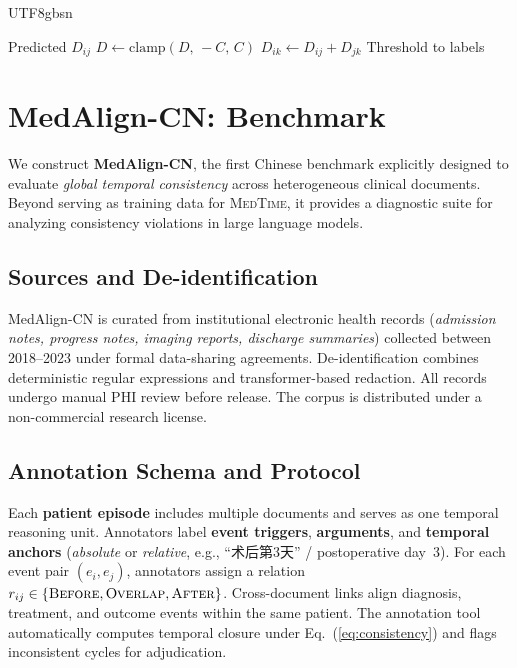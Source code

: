 \documentclass[11pt]{article}
\begin{document}
\begin{CJK*}{UTF8}{gbsn}
\begin{algorithm}[t]
\small
\caption{Hard Acyclic Closure for Inference}
\label{alg:hard-closure-test}
\begin{algorithmic}[1]
\REQUIRE Predicted $D_{ij}$
\STATE $D \leftarrow \mathrm{clamp}(D,\,-C,\,C)$
     \STATE $D_{ik} \leftarrow D_{ij}+D_{jk}$
  \ENDIF
\ENDFOR
\STATE Threshold to labels
\end{algorithmic}
\end{algorithm}

\section{MedAlign-CN: Benchmark}
\label{sec:dataset}

We construct \textbf{MedAlign-CN}, the first Chinese benchmark explicitly designed to evaluate \emph{global temporal consistency} across heterogeneous clinical documents. Beyond serving as training data for \textsc{MedTime}, it provides a diagnostic suite for analyzing consistency violations in large language models.

\subsection{Sources and De-identification}
MedAlign-CN is curated from institutional electronic health records (\textit{admission notes, progress notes, imaging reports, discharge summaries}) collected between 2018–2023 under formal data-sharing agreements. De-identification combines deterministic regular expressions and transformer-based redaction. All records undergo manual PHI review before release. The corpus is distributed under a non-commercial research license.

\subsection{Annotation Schema and Protocol}
Each \textbf{patient episode} includes multiple documents and serves as one temporal reasoning unit. Annotators label \textbf{event triggers}, \textbf{arguments}, and \textbf{temporal anchors} (\textit{absolute} or \textit{relative}, e.g., “术后第3天” / postoperative day~3). For each event pair $(e_i, e_j)$, annotators assign a relation $r_{ij} \in \{\textsc{Before}, \textsc{Overlap}, \textsc{After}\}$. Cross-document links align diagnosis, treatment, and outcome events within the same patient. The annotation tool automatically computes temporal closure under Eq.~(\ref{eq:consistency}) and flags inconsistent cycles for adjudication.


\end{CJK*}
\end{document}
